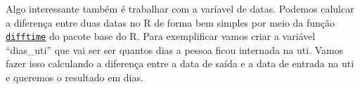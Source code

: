 \documentclass[
  letterpaper,
  DIV=11,
  numbers=noendperiod]{scrreprt}
\newenvironment{Shaded}{\begin{snugshade}}{\end{snugshade}}
\newcommand{\AttributeTok}[1]{\textcolor[rgb]{0.40,0.45,0.13}{#1}}
\newcommand{\FunctionTok}[1]{\textcolor[rgb]{0.28,0.35,0.67}{#1}}
\newcommand{\NormalTok}[1]{\textcolor[rgb]{0.00,0.23,0.31}{#1}}
\newcommand{\OtherTok}[1]{\textcolor[rgb]{0.00,0.23,0.31}{#1}}
\newcommand{\SpecialCharTok}[1]{\textcolor[rgb]{0.37,0.37,0.37}{#1}}
\newcommand{\StringTok}[1]{\textcolor[rgb]{0.13,0.47,0.30}{#1}}
\begin{document}
Algo interessante também é trabalhar com a varíavel de datas. Podemos
calulcar a diferença entre duas datas no R de forma bem simples por meio
da função
\href{https://statisticsglobe.com/difftime-r-function/}{\texttt{difftime}}
do pacote base do R. Para exemplificar vamos criar a variável
``dias\_uti'' que vai ser ser quantos dias a pessoa ficou internada na
uti. Vamos fazer isso calculando a diferença entre a data de saída e a
data de entrada na uti e queremos o resultado em dias.

\begin{Shaded}
\end{Shaded}
\end{document}
